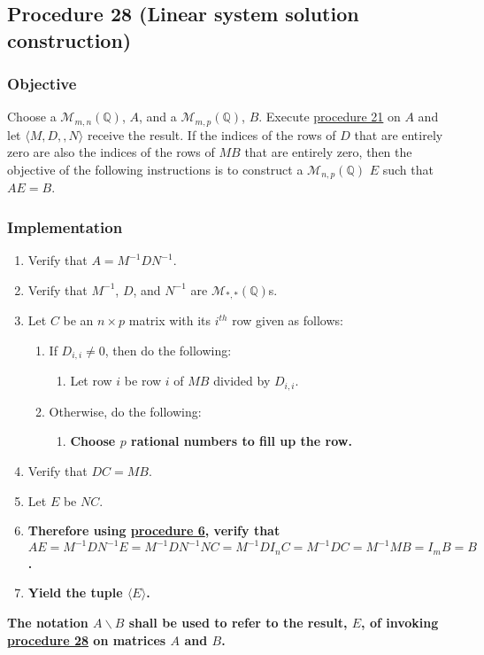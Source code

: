 \documentclass[twocolumn]{article}
\begin{document}
		\subsection{Procedure 28 (Linear system solution construction)}\label{sec:procedure 28}
			\subsubsection{Objective}
				Choose a $\mathcal{M}_{m,n}(\mathbb{Q})$, $A$, and a $\mathcal{M}_{m,p}(\mathbb{Q})$, $B$. Execute \hyperref[sec:procedure 21]{procedure 21} on $A$ and let $\langle M,D,,N\rangle$ receive the result. If the indices of the rows of $D$ that are entirely zero are also the indices of the rows of $MB$ that are entirely zero, then the objective of the following instructions is to construct a $\mathcal{M}_{n,p}(\mathbb{Q})$ $E$ such that $AE=B$.
			\subsubsection{Implementation}
				\begin{enumerate}
					\item Verify that $A=M^{-1}DN^{-1}$.
					\item Verify that $M^{-1}$, $D$, and $N^{-1}$ are $\mathcal{M}_{*,*}(\mathbb{Q})$s.
					\item Let $C$ be an $n\times p$ matrix with its $i^{th}$ row given as follows:
					\begin{enumerate}
						\item If $D_{i,i}\ne 0$, then do the following:
						\begin{enumerate}
							\item Let row $i$ be row $i$ of $MB$ divided by $D_{i,i}$.
						\end{enumerate}
						\item Otherwise, do the following:
						\begin{enumerate}
							\item \textbf{Choose $p$ rational numbers to fill up the row.}
						\end{enumerate}
					\end{enumerate}
					\item Verify that $DC=MB$.
					\item Let $E$ be $NC$.
					\item \textbf{Therefore using \hyperref[sec:procedure 6]{procedure 6}, verify that $AE=M^{-1}DN^{-1}E=M^{-1}DN^{-1}NC=M^{-1}DI_nC=M^{-1}DC=M^{-1}MB=I_mB=B$.}
					\item \textbf{Yield the tuple $\langle E\rangle$.}
				\end{enumerate}
			\textbf{The notation $A\backslash B$ shall be used to refer to the result, $E$, of invoking \hyperref[sec:procedure 28]{procedure 28} on matrices $A$ and $B$.}
			
\end{document}
